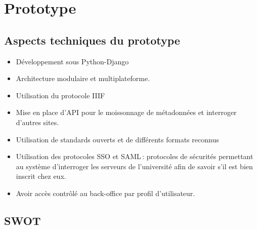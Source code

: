 \section{Prototype}

\subsection{Aspects techniques du prototype}

\begin{itemize}
	\item Développement sous Python-Django 
\item Architecture modulaire et multiplateforme. 
\item Utilisation du protocole IIIF 
\item Mise en place d’API pour le moissonnage de métadonnées et interroger d’autres sites. 
\item Utilisation de standards ouverts et de différents formats reconnus 
\item Utilisation des protocoles SSO et SAML : protocoles de sécurités permettant au système d’interroger les serveurs de l’université afin de savoir s’il est bien inscrit chez eux. 
\item Avoir accès contrôlé au back-office par profil d’utilisateur. 
\end{itemize}
\vfill

\subsection{SWOT} 

